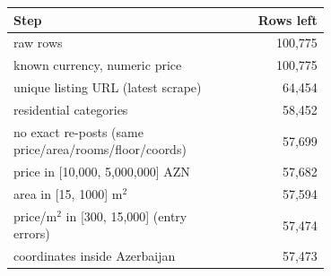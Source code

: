 \begin{tabular}{@{}p{0.70\linewidth}r@{}}
\toprule
Step & Rows left \\
\midrule
    raw rows & 100,775 \\
    known currency, numeric price & 100,775 \\
    unique listing URL (latest scrape) & 64,454 \\
    residential categories & 58,452 \\
    no exact re-posts (same price/area/rooms/floor/coords) & 57,699 \\
    price in [10,000, 5,000,000] AZN & 57,682 \\
    area in [15, 1000] m$^2$ & 57,594 \\
    price/m$^2$ in [300, 15,000] (entry errors) & 57,474 \\
    coordinates inside Azerbaijan & 57,473 \\
\bottomrule
\end{tabular}
